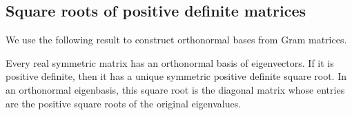 \subsection{Square roots of positive definite matrices}\label{subsec:spectral-preliminaries-matrices}
We use the following result to construct orthonormal bases from Gram matrices.

\begin{theorem}\label{thm:matrix-square-root}
Every real symmetric matrix has an orthonormal basis of eigenvectors.
If it is positive definite,
then it has a unique symmetric positive definite square root.
In an orthonormal eigenbasis,
this square root is the diagonal matrix whose entries are the positive
square roots of the original eigenvalues.
\end{theorem}
